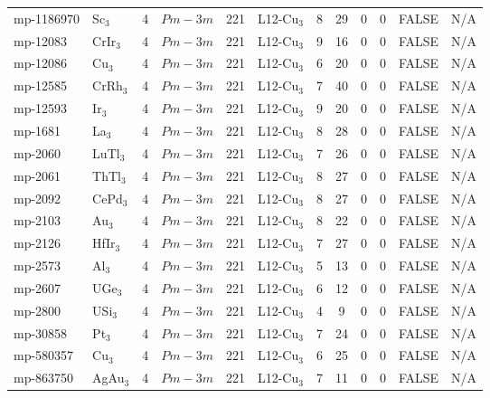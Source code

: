 {\begin{longtable}{llcccccccccc}
    mp-1186970 & Sc$_{3}$ & 4     & $Pm-3m$ & 221   & L12-Cu$_{3}$ & 8     & 29    & 0     & 0     & FALSE & N/A \\
    mp-12083 & CrIr$_{3}$ & 4     & $Pm-3m$ & 221   & L12-Cu$_{3}$ & 9     & 16    & 0     & 0     & FALSE & N/A \\
    mp-12086 & Cu$_{3}$ & 4     & $Pm-3m$ & 221   & L12-Cu$_{3}$ & 6     & 20    & 0     & 0     & FALSE & N/A \\
    mp-12585 & CrRh$_{3}$ & 4     & $Pm-3m$ & 221   & L12-Cu$_{3}$ & 7     & 40    & 0     & 0     & FALSE & N/A \\
    mp-12593 & Ir$_{3}$ & 4     & $Pm-3m$ & 221   & L12-Cu$_{3}$ & 9     & 20    & 0     & 0     & FALSE & N/A \\
    mp-1681 & La$_{3}$ & 4     & $Pm-3m$ & 221   & L12-Cu$_{3}$ & 8     & 28    & 0     & 0     & FALSE & N/A \\
    mp-2060 & LuTl$_{3}$ & 4     & $Pm-3m$ & 221   & L12-Cu$_{3}$ & 7     & 26    & 0     & 0     & FALSE & N/A \\
    mp-2061 & ThTl$_{3}$ & 4     & $Pm-3m$ & 221   & L12-Cu$_{3}$ & 8     & 27    & 0     & 0     & FALSE & N/A \\
    mp-2092 & CePd$_{3}$ & 4     & $Pm-3m$ & 221   & L12-Cu$_{3}$ & 8     & 27    & 0     & 0     & FALSE & N/A \\
    mp-2103 & Au$_{3}$ & 4     & $Pm-3m$ & 221   & L12-Cu$_{3}$ & 8     & 22    & 0     & 0     & FALSE & N/A \\
    mp-2126 & HfIr$_{3}$ & 4     & $Pm-3m$ & 221   & L12-Cu$_{3}$ & 7     & 27    & 0     & 0     & FALSE & N/A \\
    mp-2573 & Al$_{3}$ & 4     & $Pm-3m$ & 221   & L12-Cu$_{3}$ & 5     & 13    & 0     & 0     & FALSE & N/A \\
    mp-2607 & UGe$_{3}$ & 4     & $Pm-3m$ & 221   & L12-Cu$_{3}$ & 6     & 12    & 0     & 0     & FALSE & N/A \\
    mp-2800 & USi$_{3}$ & 4     & $Pm-3m$ & 221   & L12-Cu$_{3}$ & 4     & 9     & 0     & 0     & FALSE & N/A \\
    mp-30858 & Pt$_{3}$ & 4     & $Pm-3m$ & 221   & L12-Cu$_{3}$ & 7     & 24    & 0     & 0     & FALSE & N/A \\
    mp-580357 & Cu$_{3}$ & 4     & $Pm-3m$ & 221   & L12-Cu$_{3}$ & 6     & 25    & 0     & 0     & FALSE & N/A \\
    mp-863750 & AgAu$_{3}$ & 4     & $Pm-3m$ & 221   & L12-Cu$_{3}$ & 7     & 11    & 0     & 0     & FALSE & N/A \\

\end{longtable}}

